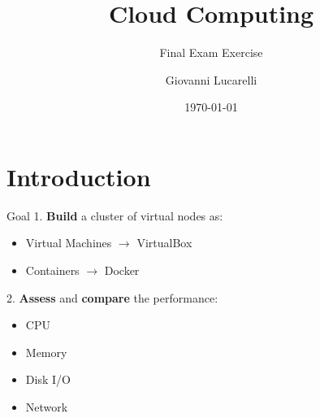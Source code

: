 \documentclass[10pt]{beamer}
\title{Cloud Computing}
\subtitle{Final Exam Exercise}
\date{\today}
\author[longname]{Giovanni Lucarelli}
\begin{document}
\maketitle

\section{Introduction}

\begin{frame}{Goal}
  1. \textbf{Build} a cluster of virtual nodes as:
  \begin{itemize}
    \item Virtual Machines $\rightarrow$ \alert{VirtualBox}
    \item Containers $\rightarrow$ \alert{Docker}
  \end{itemize}
  2. \textbf{Assess} and \textbf{compare} the performance:
  \begin{itemize}
    \item CPU
    \item Memory
    \item Disk I/O
    \item Network
  \end{itemize}
\end{frame}
\end{document}
